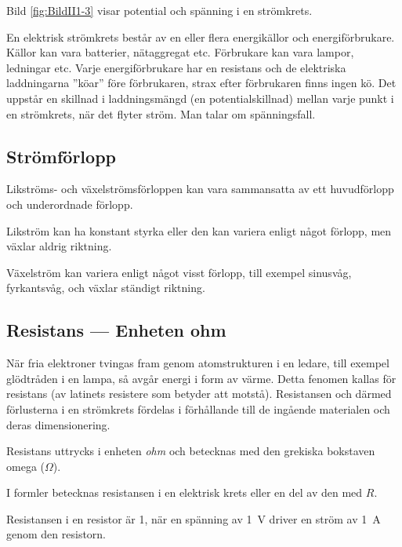 Bild \ref{fig:BildII1-3} visar potential och spänning i en strömkrets.

En elektrisk strömkrets består av en eller flera energikällor och
energiförbrukare.
Källor kan vara batterier, nätaggregat etc.
Förbrukare kan vara lampor, ledningar etc.
Varje energiförbrukare har en resistans och de elektriska laddningarna ''köar''
före förbrukaren, strax efter förbrukaren finns ingen kö.
Det uppstår en skillnad i laddningsmängd (en potentialskillnad) mellan varje
punkt i en strömkrets, när det flyter ström.
Man talar om spänningsfall.

\subsection{Strömförlopp}

Likströms- och växelströmsförloppen kan vara sammansatta av ett huvudförlopp
och underordnade förlopp.

Likström kan ha konstant styrka eller den kan variera enligt något förlopp,
men växlar aldrig riktning.

Växelström kan variera enligt något visst förlopp, till exempel sinusvåg,
fyrkantsvåg, och växlar ständigt riktning.

\subsection{Resistans --- Enheten ohm}

När fria elektroner tvingas fram genom atomstrukturen i en ledare, till exempel
glödtråden i en lampa, så avgår energi i form av värme.
Detta fenomen kallas för resistans (av latinets resistere som betyder att
motstå).
Resistansen och därmed förlusterna i en strömkrets fördelas i
förhållande till de ingående materialen och deras dimensionering.

Resistans uttrycks i enheten \emph{ohm} \cite{SIbrochure8} och betecknas med
den grekiska bokstaven omega (\(\Omega\)).

I formler betecknas resistansen i en elektrisk krets eller en del av den med
\(R\).

Resistansen i en resistor är \SI{1}{\Omega}, när en spänning av \SI{1}{V}
driver en ström av \SI{1}{A} genom den resistorn.

